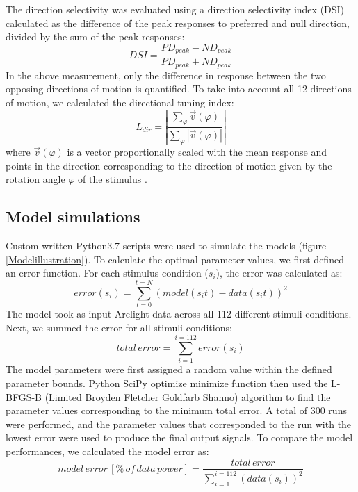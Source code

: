 \documentclass[9pt,lineno]{elife}
\begin{document}
The direction selectivity was evaluated using a direction selectivity index (DSI) calculated as the difference of the peak responses to preferred and null direction, divided by the sum of the peak responses:
\begin{equation}
DSI = \frac{PD_{peak} - ND_{peak}}{PD_{peak} + ND_{peak}}
\label{DSIequation}
\end{equation}
In the above measurement, only the difference in response between the two opposing directions of motion is quantified. To take into account all 12 directions of motion, we calculated the directional tuning index:
\begin{equation}
L_{dir} = \left|\frac{\sum_{\varphi}^{}{\vec{v}(\varphi)}}{\sum_{\varphi}^{}{|\vec{v}(\varphi)|}}\right|
\label{Ldirequation}
\end{equation}
where $\vec{v}(\varphi)$ is a vector proportionally scaled with the mean response and points in the direction corresponding to the direction of motion given by the rotation angle $\varphi$ of the stimulus \parencite{Mazurek2014}.

\subsection{Model simulations}
Custom-written Python3.7 scripts were used to simulate the models (figure \ref{Modelillustration}). To calculate the optimal parameter values, we first defined an error function. For each stimulus condition ($s_{i}$), the error was calculated as: 
\begin{equation}
error(s_{i}) = \sum_{t=0}^{t=N} (model (s_{i}t) - data (s_{i}t))^2
\label{error}
\end{equation}
The model took as input Arclight data across all 112 different stimuli conditions. Next, we summed the error for all stimuli conditions: 
\begin{equation}
total\, error = \sum_{i=1}^{i=112} error(s_{i})
\label{totalerror}
\end{equation}
The model parameters were first assigned a random value within the defined parameter bounds. Python SciPy optimize minimize function then used the L-BFGS-B (Limited Broyden Fletcher Goldfarb Shanno) algorithm to find the parameter values corresponding to the minimum total error. A total of 300 runs were performed, and the parameter values that corresponded to the run with the lowest error were used to produce the final output signals. To compare the model performances, we calculated the model error as: 
\begin{equation}
model \, error \, [\% \, of \, data \, power] = \frac{total \, error}{\sum_{i=1}^{i=112}(data(s_{i}))^2} 
\label{modelerror}
\end{equation}
\end{document}
